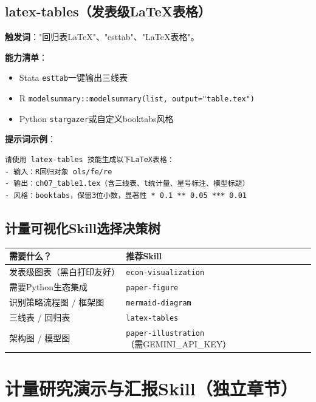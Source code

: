 \subsection{latex-tables（发表级LaTeX表格）}
\textbf{触发词}："回归表LaTeX"、"esttab"、"LaTeX表格"。

\textbf{能力清单}：
\begin{itemize}[leftmargin=1em]
  \item Stata \texttt{esttab}一键输出三线表
  \item R \texttt{modelsummary::modelsummary(list, output="table.tex")}
  \item Python \texttt{stargazer}或自定义booktabs风格
\end{itemize}

\textbf{提示词示例}：
\begin{lstlisting}
请使用 latex-tables 技能生成以下LaTeX表格：
- 输入：R回归对象 ols/fe/re
- 输出：ch07_table1.tex（含三线表、t统计量、星号标注、模型标题）
- 风格：booktabs，保留3位小数，显著性 * 0.1 ** 0.05 *** 0.01
\end{lstlisting}

\subsection{计量可视化Skill选择决策树}

\begin{table}[H]
\centering
\begin{tabular}{|l|l|}
\hline
\textbf{需要什么？} & \textbf{推荐Skill} \\
\hline
发表级图表（黑白打印友好） & \texttt{econ-visualization} \\
需要Python生态集成 & \texttt{paper-figure} \\
识别策略流程图 / 框架图 & \texttt{mermaid-diagram} \\
三线表 / 回归表 & \texttt{latex-tables} \\
架构图 / 模型图 & \texttt{paper-illustration}（需GEMINI\_API\_KEY） \\
\hline
\end{tabular}
\end{table}

\section{计量研究演示与汇报Skill（独立章节）}


